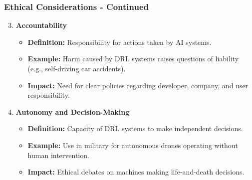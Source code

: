 \documentclass[aspectratio=169]{beamer}
\begin{document}
\begin{frame}[fragile]
    \frametitle{Ethical Considerations - Continued}
    \begin{enumerate}
        \setcounter{enumii}{2} %
        \item \textbf{Accountability}
            \begin{itemize}
                \item \textbf{Definition:} Responsibility for actions taken by AI systems.
                \item \textbf{Example:} Harm caused by DRL systems raises questions of liability (e.g., self-driving car accidents).
                \item \textbf{Impact:} Need for clear policies regarding developer, company, and user responsibility.
            \end{itemize}
        
        \item \textbf{Autonomy and Decision-Making}
            \begin{itemize}
                \item \textbf{Definition:} Capacity of DRL systems to make independent decisions.
                \item \textbf{Example:} Use in military for autonomous drones operating without human intervention.
                \item \textbf{Impact:} Ethical debates on machines making life-and-death decisions.
            \end{itemize}
    \end{enumerate}
\end{frame}
\end{document}
